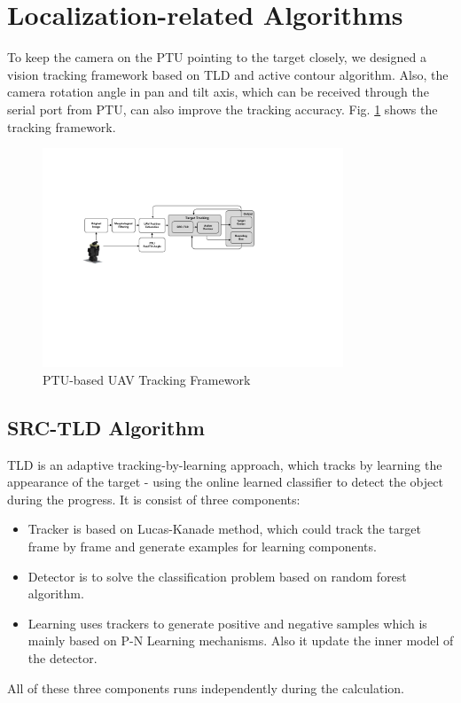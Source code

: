 \section{Localization-related Algorithms}
To keep the camera on the PTU pointing to the target closely, we designed a   vision tracking framework based on TLD and active contour algorithm. Also, the camera rotation angle in pan and tilt axis, which can be received through the serial port from PTU, can also improve the tracking accuracy. Fig. \ref{fig:sci01_tracking_framework} shows the tracking framework.

\begin{figure}[!th]
	\centering
	\includegraphics[width=0.8\textwidth]{Figs/sci01_tracking_framework.pdf}	
	\caption{PTU-based UAV Tracking Framework}
	\label{fig:sci01_tracking_framework}
\end{figure}

\subsection{SRC-TLD Algorithm}
TLD is an adaptive tracking-by-learning approach, which tracks by learning the appearance of the target - using the online learned classifier to detect the object during the progress. It is consist of three components: 
\begin{itemize}
	\item Tracker is based on Lucas-Kanade method, which could track the target frame by frame and generate examples for learning components.
	
	\item Detector is to solve the classification problem based on random forest algorithm.
	
	\item Learning uses trackers to generate positive and negative samples which is mainly based on P-N Learning mechanisms. Also it update the inner model of the detector.
\end{itemize}
All of these three components runs independently during the calculation.

